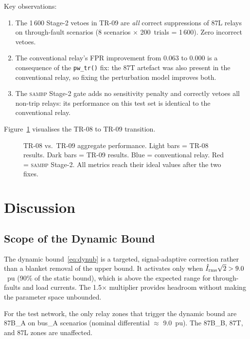 \documentclass[12pt,a4paper]{article}
\newcommand{\SAMBP}{\textsc{sambp}}
\begin{document}
\noindent Key observations:
\begin{enumerate}
  \item The 1\,600 Stage-2 vetoes in TR-09 are \emph{all} correct
    suppressions of 87L relays on through-fault scenarios (8 scenarios
    $\times$ 200~trials = 1\,600).  Zero incorrect vetoes.

  \item The conventional relay's FPR improvement from 0.063 to 0.000
    is a consequence of the \texttt{pw\_tr()} fix: the 87T artefact
    was also present in the conventional relay, so fixing the
    perturbation model improves both.

  \item The \SAMBP{} Stage-2 gate adds no sensitivity penalty and
    correctly vetoes all non-trip relays: its performance on this
    test set is identical to the conventional relay.
\end{enumerate}

Figure~\ref{fig:comparison} visualises the TR-08 to TR-09 transition.

\begin{figure}[ht]
  \centering
  
  \caption{TR-08 vs.\ TR-09 aggregate performance.
    Light bars = TR-08 results.  Dark bars = TR-09 results.
    Blue = conventional relay.  Red = \SAMBP{} Stage-2.
    All metrics reach their ideal values after the two fixes.}
  \label{fig:comparison}
\end{figure}

\section{Discussion}

\subsection{Scope of the Dynamic Bound}

The dynamic bound~\eqref{eq:dynub} is a targeted, signal-adaptive
correction rather than a blanket removal of the upper bound.  It
activates only when $\hat{I}_{\rm rms}\sqrt{2} > 9.0$~pu (90\% of the
static bound), which is above the expected range for through-faults and
load currents.  The 1.5$\times$ multiplier provides headroom without
making the parameter space unbounded.

For the test network, the only relay zones that trigger the dynamic
bound are 87B\_A on bus\_A scenarios (nominal differential $\approx$
9.0~pu).  The 87B\_B, 87T, and 87L zones are unaffected.
\end{document}
